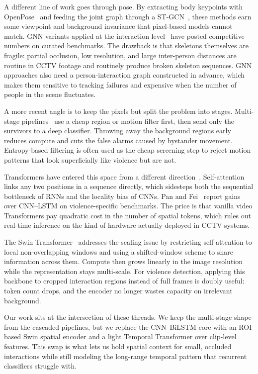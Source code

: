 \documentclass[conference]{IEEEtran}
\begin{document}
A different line of work goes through pose. By extracting body keypoints with OpenPose~\cite{cao_openpose_2019} and feeding the joint graph through a ST-GCN~\cite{yan_stgcn_2018}, these methods earn some viewpoint and background invariance that pixel-based models cannot match. GNN variants applied at the interaction level~\cite{yun_missiongnn_2024} have posted competitive numbers on curated benchmarks. The drawback is that skeletons themselves are fragile: partial occlusion, low resolution, and large inter-person distances are routine in CCTV footage and routinely produce broken skeleton sequences. GNN approaches also need a person-interaction graph constructed in advance, which makes them sensitive to tracking failures and expensive when the number of people in the scene fluctuates.

A more recent angle is to keep the pixels but split the problem into stages. Multi-stage pipelines~\cite{yun_missiongnn_2024, nguyen_multistage_2021} use a cheap region or motion filter first, then send only the survivors to a deep classifier. Throwing away the background regions early reduces compute and cuts the false alarms caused by bystander movement. Entropy-based filtering is often used as the cheap screening step to reject motion patterns that look superficially like violence but are not.

Transformers have entered this space from a different direction~\cite{vaswani_attention_2023, dosovitskiy_image_2021, bertasius_is_2021, arnab_vivit_2021, pan_violence_2022}. Self-attention links any two positions in a sequence directly, which sidesteps both the sequential bottleneck of RNNs and the locality bias of CNNs. Pan and Fei~\cite{pan_violence_2022} report gains over CNN--LSTM on violence-specific benchmarks. The price is that vanilla video Transformers pay quadratic cost in the number of spatial tokens, which rules out real-time inference on the kind of hardware actually deployed in CCTV systems.

The Swin Transformer~\cite{9710580} addresses the scaling issue by restricting self-attention to local non-overlapping windows and using a shifted-window scheme to share information across them. Compute then grows linearly in the image resolution while the representation stays multi-scale. For violence detection, applying this backbone to cropped interaction regions instead of full frames is doubly useful: token count drops, and the encoder no longer wastes capacity on irrelevant background.

Our work sits at the intersection of these threads. We keep the multi-stage shape from the cascaded pipelines, but we replace the CNN--BiLSTM core with an ROI-based Swin spatial encoder and a light Temporal Transformer over clip-level features. This swap is what lets us hold spatial context for small, occluded interactions while still modeling the long-range temporal pattern that recurrent classifiers struggle with.
\end{document}
